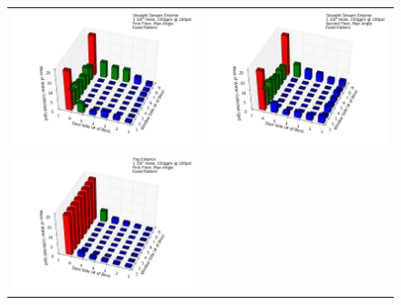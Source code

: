 \documentclass{article}
\begin{document}
\clearpage




\begin{figure}[ht]
\begin{tabular*}{\textwidth}{lr}
\includegraphics[width=3.2in]{../ADD_Analysis/Figures/15-12-08_113237_Datafile_Straight_Stream_Exterior.png} &
\includegraphics[width=3.2in]{../ADD_Analysis/Figures/15-12-07_145156_Datafile_Straight_Stream_Exterior.png} \\
\includegraphics[width=3.2in]{../ADD_Analysis/Figures/15-12-08_121806_Datafile_Fog_Exterior.png} &

\end{tabular*}
\end{figure}
\end{document}
